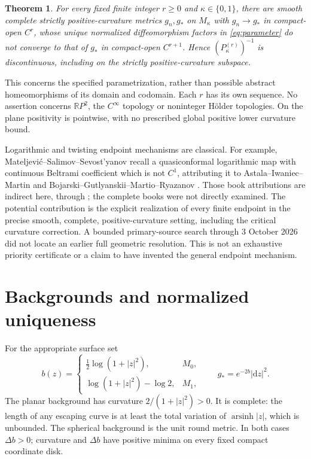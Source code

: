 \documentclass[11pt]{article}
\newtheorem{theorem}{Theorem}
\newcommand{\R}{\mathbb R}
\newcommand{\dd}{\mathrm d}
\begin{document}
\begin{theorem}\label{thm:main}
For every fixed finite integer $r\geq0$ and $\kappa\in\{0,1\}$, there are smooth complete strictly positive-curvature metrics $g_n,g_*$ on $M_\kappa$ with $g_n\to g_*$ in compact-open $C^r$, whose unique normalized diffeomorphism factors in \eqref{eq:parameter} do not converge to that of $g_*$ in compact-open $C^{r+1}$. Hence $(P_\kappa^{(r)})^{-1}$ is discontinuous, including on the strictly positive-curvature subspace.
\end{theorem}

This concerns the specified parametrization, rather than possible abstract homeomorphisms of its domain and codomain. Each $r$ has its own sequence. No assertion concerns $\R P^2$, the $C^\infty$ topology or noninteger H\"older topologies. On the plane positivity is pointwise, with no prescribed global positive lower curvature bound.

Logarithmic and twisting endpoint mechanisms are classical. For example, Mateljevi\'c--Salimov--Sevost'yanov \cite[Section 7, Example 5]{MSS22} recall a quasiconformal logarithmic map with continuous Beltrami coefficient which is not $C^1$, attributing it to Astala--Iwaniec--Martin \cite{AIM09} and Bojarski--Gutlyanskii--Martio--Ryazanov \cite{BGR13}. Those book attributions are indirect here, through \cite{MSS22}; the complete books were not directly examined. The potential contribution is the explicit realization of every finite endpoint in the precise smooth, complete, positive-curvature setting, including the critical curvature correction. A bounded primary-source search through 3 October 2026 did not locate an earlier full geometric resolution. This is not an exhaustive priority certificate or a claim to have invented the general endpoint mechanism.

\section{Backgrounds and normalized uniqueness}
For the appropriate surface set
\begin{equation}\label{eq:background}
 b(z)=\begin{cases}\frac12\log(1+|z|^2),&M_0,\\
 \log(1+|z|^2)-\log2,&M_1,
 \end{cases}\qquad g_*=e^{-2b}|\dd z|^2.
\end{equation}
The planar background has curvature $2/(1+|z|^2)>0$. It is complete: the length of any escaping curve is at least the total variation of $\operatorname{arsinh}|z|$, which is unbounded. The spherical background is the unit round metric. In both cases $\Delta b>0$; curvature and $\Delta b$ have positive minima on every fixed compact coordinate disk.
\end{document}
